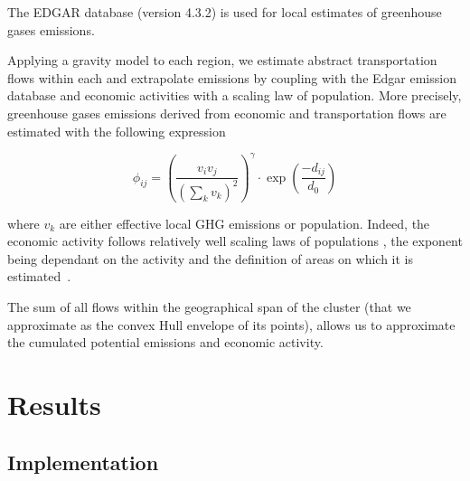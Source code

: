 \documentclass{jimis-en}
\begin{document}
The EDGAR database \citep{janssens2017edgar} (version 4.3.2) is used for local estimates of greenhouse gases emissions.



Applying a gravity model to each region, we estimate abstract transportation flows within each and extrapolate emissions by coupling with the Edgar emission database \citep{janssens2017edgar} and economic activities with a scaling law of population.  More precisely, greenhouse gases emissions derived from economic and transportation flows are estimated with the following expression 

\begin{equation}
\phi_{ij} = \left(\frac{v_i v_j}{(\sum_k v_k)^2}\right)^\gamma \cdot \exp\left(\frac{-d_{ij}}{d_0}\right)
\end{equation}

where $v_k$ are either effective local GHG emissions or population. Indeed, the economic activity follows relatively well scaling laws of populations \cite{bettencourt2007growth}, the exponent being dependant on the activity and the definition of areas on which it is estimated~\citep{cottineau2017diverse}.


The sum of all flows within the geographical span of the cluster (that we approximate as the convex Hull envelope of its points), allows us to approximate the cumulated potential emissions and economic activity.




\section{Results}

\subsection{Implementation}




\end{document}
